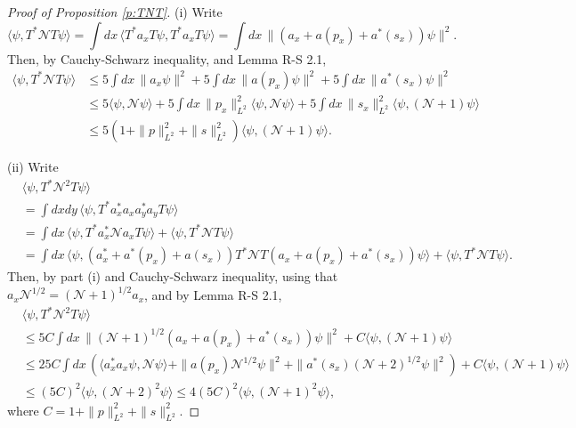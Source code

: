 \documentclass[11pt,a4paper]{scrartcl} %
\newcommand{\N}{\mathcal{N}}
\begin{document}
\begin{proof}[Proof of Proposition \ref{p:TNT}]
  (i) Write
  \[
    \langle \psi, T^* \N T \psi \rangle = \int dx \, \langle T^* a_x T \psi,
    T^* a_x T \psi \rangle = \int dx \, \| (a_x + a(p_x) + a^*(s_x)) \psi
    \|^2.
  \]
  Then, by Cauchy-Schwarz inequality, and Lemma R-S 2.1,
  \begin{align*}
    \langle \psi, T^* \N T \psi \rangle & \le 5 \int dx \, \| a_x \psi \|^2 +
    5 \int dx \, \| a(p_x) \psi \|^2 + 5 \int dx \, \| a^*(s_x) \psi \|^2 \\
    & \le 5 \langle \psi, \N \psi \rangle + 5 \int dx \, \| p_x \|_{L^2}^2
    \langle \psi, \N \psi \rangle + 5 \int dx \, \| s_x \|_{L^2}^2 \langle
    \psi, (\N+1) \psi \rangle \\
    & \le 5 (1 + \| p \|_{L^2}^2 + \| s \|_{L^2}^2) \langle \psi, (\N+1) \psi
    \rangle.
  \end{align*}


  (ii) Write
  \begin{align*}
    & \langle \psi, T^* \N^2 T \psi \rangle \\
    & = \int dxdy \, \langle \psi, T^* a_x^* a_x a_y^* a_y T \psi \rangle \\
    & = \int dx \, \langle \psi, T^* a_x^* \N a_x T \psi \rangle + \langle
    \psi, T^* \N T \psi \rangle \\
    & = \int dx \, \langle \psi, (a_x^* + a^*(p_x) + a(s_x)) T^* \N T (a_x +
    a(p_x) + a^*(s_x)) \psi \rangle + \langle \psi, T^* \N T \psi \rangle.
  \end{align*}
  Then, by part (i) and Cauchy-Schwarz inequality, using that $a_x \N^{1/2} =
  (\N+1)^{1/2} a_x$, and by Lemma R-S 2.1,
  \begin{align*}
    & \langle \psi, T^* \N^2 T \psi \rangle \\
    & \le 5C \int dx \, \| (\N+1)^{1/2} (a_x + a(p_x) + a^*(s_x)) \psi \|^2 + C
    \langle \psi, (\N+1) \psi \rangle \\
    & \le 25C \int dx \, ( \langle a_x^* a_x \psi, \N \psi \rangle + \| a(p_x)
    \N^{1/2} \psi \|^2 + \| a^*(s_x) (\N+2)^{1/2} \psi \|^2 ) + C \langle
    \psi, (\N+1) \psi \rangle \\
    & \le (5C)^2 \langle \psi, (\N+2)^2 \psi \rangle \le 4(5C)^2 \langle \psi,
    (\N+1)^2 \psi \rangle,
  \end{align*}
  where $C = 1 + \| p \|_{L^2}^2 + \| s \|_{L^2}^2$.



\end{proof}
\end{document}

